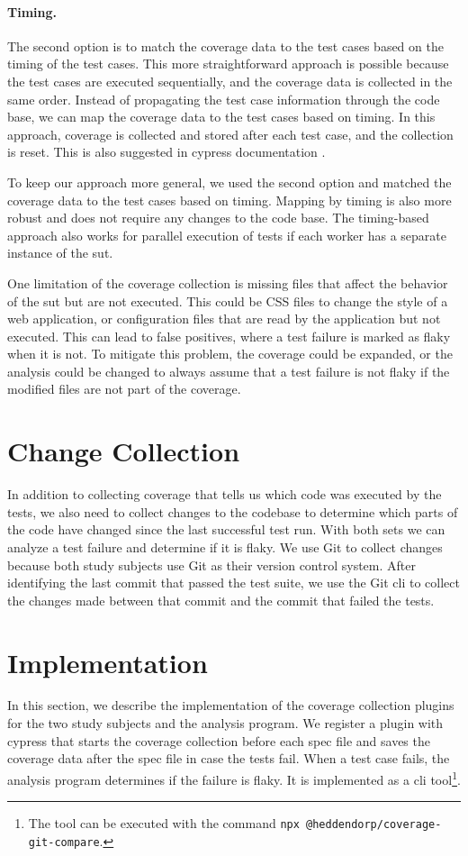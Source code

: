 \paragraph{Timing.} The second option is to match the coverage data to the test cases based on the timing of the test cases.
This more straightforward approach is possible because the test cases are executed sequentially, and the coverage data is collected in the same order.
Instead of propagating the test case information through the code base, we can map the coverage data to the test cases based on timing.
In this approach, coverage is collected and stored after each test case, and the collection is reset.
This is also suggested in cypress documentation \autocite{noauthor_code_nodate}.

To keep our approach more general, we used the second option and matched the coverage data to the test cases based on timing.
Mapping by timing is also more robust and does not require any changes to the code base.
The timing-based approach also works for parallel execution of tests if each worker has a separate instance of the \ac{sut}.

One limitation of the coverage collection is missing files that affect the behavior of the \ac{sut} but are not executed.
This could be CSS files to change the style of a web application, or configuration files that are read by the application but not executed.
This can lead to false positives, where a test failure is marked as flaky when it is not.
To mitigate this problem, the coverage could be expanded, or the analysis could be changed to always assume that a test failure is not flaky if the modified files are not part of the coverage.
\section{Change Collection}
In addition to collecting coverage that tells us which code was executed by the tests, we also need to collect changes to the codebase to determine which parts of the code have changed since the last successful test run.
With both sets we can analyze a test failure and determine if it is flaky.
We use Git to collect changes because both study subjects use Git as their version control system.
After identifying the last commit that passed the test suite, we use the Git \ac{cli} to collect the changes made between that commit and the commit that failed the tests.

\section{Implementation}
In this section, we describe the implementation of the coverage collection plugins for the two study subjects and the analysis program.
We register a plugin with cypress that starts the coverage collection before each spec file and saves the coverage data after the spec file in case the tests fail.
When a test case fails, the analysis program determines if the failure is flaky.
It is implemented as a \ac{cli} tool\footnote{The tool can be executed with the command \texttt{npx @heddendorp/coverage-git-compare}.}.

